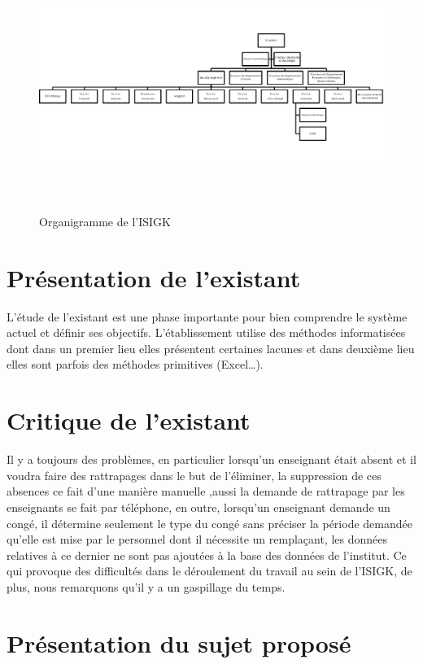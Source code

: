 \documentclass[12 pt ]{report}
\begin{document}
\begin{figure}[h]
\includegraphics[height=8cm]{Organigramme.png}
\caption{ Organigramme de l'ISIGK}
\end{figure}
\newpage
\clearpage
\section{Présentation de l’existant }

L’étude de l’existant est une phase importante pour bien comprendre le système actuel et définir ses objectifs. L’établissement utilise des méthodes informatisées dont dans un premier lieu elles présentent certaines lacunes et dans deuxième lieu elles sont parfois des méthodes primitives (Excel…). 
\section{Critique de l’existant }
Il y a toujours des problèmes, en particulier lorsqu’un enseignant était absent et il voudra faire des rattrapages dans le but de l'éliminer, la suppression de ces absences ce fait d’une manière manuelle ,aussi la demande de rattrapage par les enseignants  se fait par téléphone, en outre, lorsqu’un enseignant demande un congé, il détermine seulement le type du congé sans préciser la période demandée qu’elle est mise par le personnel dont il nécessite un remplaçant, les données relatives à ce dernier ne sont pas ajoutées à la base des données de l’institut. 
Ce qui provoque des difficultés dans le déroulement du travail au sein de l’ISIGK, de plus, nous remarquons qu’il y a un gaspillage du temps.    

\section{Présentation du sujet proposé }
\end{document}
